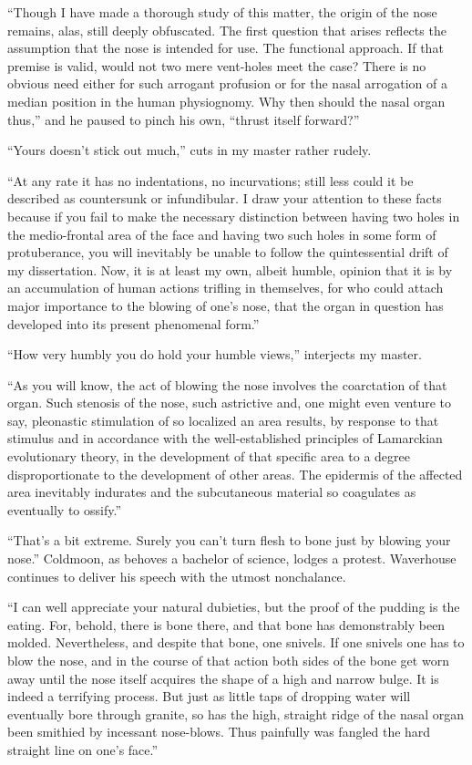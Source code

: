 \documentclass[12pt, openright]{book}
\begin{document}
``Though I have made a thorough study of this matter, the origin of the
nose remains, alas, still deeply obfuscated. The first question that
arises reflects the assumption that the nose is intended for use. The
functional approach. If that premise is valid, would not two mere
vent-holes meet the case? There is no obvious need either for such
arrogant profusion or for the nasal arrogation of a median position in
the human physiognomy. Why then should the nasal organ thus,'' and he
paused to pinch his own, ``thrust itself forward?''

``Yours doesn't stick out much,'' cuts in my master rather rudely.

``At any rate it has no indentations, no incurvations; still less could
it be described as countersunk or infundibular. I draw your attention to
these facts because if you fail to make the necessary distinction
between having two holes in the medio-frontal area of the face and
having two such holes in some form of protuberance, you will inevitably
be unable to follow the quintessential drift of my dissertation. Now, it
is at least my own, albeit humble, opinion that it is by an accumulation
of human actions trifling in themselves, for who could attach major
importance to the blowing of one's nose, that the organ in question has
developed into its present phenomenal form.''

``How very humbly you do hold your humble views,'' interjects my master.

``As you will know, the act of blowing the nose involves the coarctation
of that organ. Such stenosis of the nose, such astrictive and, one might
even venture to say, pleonastic stimulation of so localized an area
results, by response to that stimulus and in accordance with the
well-established principles of Lamarckian evolutionary theory, in the
development of that specific area to a degree disproportionate to the
development of other areas. The epidermis of the affected area
inevitably indurates and the subcutaneous material so coagulates as
eventually to ossify.''

``That's a bit extreme. Surely you can't turn flesh to bone just by
blowing your nose.'' Coldmoon, as behoves a bachelor of science, lodges
a protest. Waverhouse continues to deliver his speech with the utmost
nonchalance.

``I can well appreciate your natural dubieties, but the proof of the
pudding is the eating. For, behold, there is bone there, and that bone
has demonstrably been molded. Nevertheless, and despite that bone, one
snivels. If one snivels one has to blow the nose, and in the course of
that action both sides of the bone get worn away until the nose itself
acquires the shape of a high and narrow bulge. It is indeed a terrifying
process. But just as little taps of dropping water will eventually bore
through granite, so has the high, straight ridge of the nasal organ been
smithied by incessant nose-blows. Thus painfully was fangled the hard
straight line on one's face.''
\end{document}
